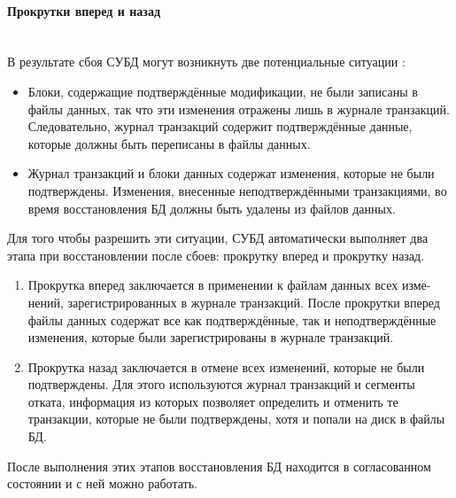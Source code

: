 \paragraph{Прокрутки вперед и назад} ~\\
В результате сбоя СУБД могут возникнуть две потенциальные ситуации \autocite{Karpova2009}:
\begin{itemize}
\item Блоки, содержащие подтверждённые модификации, не были записаны в
файлы данных, так что эти изменения отражены лишь в журнале транзакций. Следовательно, журнал транзакций содержит подтверждённые
данные, которые должны быть переписаны в файлы данных.
\item Журнал транзакций и блоки данных содержат изменения, которые не
были подтверждены. Изменения, внесенные неподтверждёнными
транзакциями, во время восстановления БД должны быть удалены из
файлов данных.
\end{itemize}
Для того чтобы разрешить эти ситуации, СУБД автоматически выполняет два
этапа при восстановлении после сбоев: прокрутку вперед и прокрутку назад.
\begin{enumerate}
 \item Прокрутка вперед заключается в применении к файлам данных всех
изме-нений, зарегистрированных в журнале транзакций. После прокрутки
вперед файлы данных содержат все как подтверждённые, так и
неподтверждённые изменения, которые были зарегистрированы в
журнале транзакций.
 \item Прокрутка назад заключается в отмене всех изменений, которые не были
подтверждены. Для этого используются журнал транзакций и сегменты
отката, информация из которых позволяет определить и отменить те
транзакции, которые не были подтверждены, хотя и попали на диск в
файлы БД.
\end{enumerate}
После выполнения этих этапов восстановления БД находится в согласованном
состоянии и с ней можно работать. 


